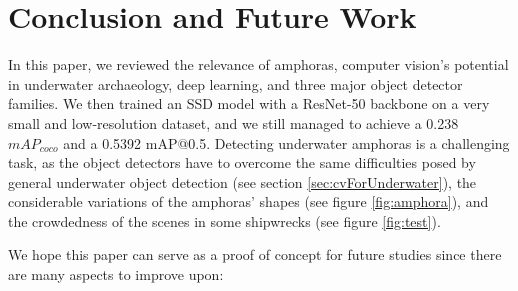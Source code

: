 \documentclass[a4paper, 11pt, oneside]{article}
\begin{document}
\clearpage

\section{Conclusion and Future Work}

In this paper, we reviewed the relevance of amphoras, computer vision's potential in underwater archaeology, deep
learning, and three major object detector families. We then trained an SSD model with a ResNet-50 backbone
on a very small and low-resolution dataset, and we still managed to achieve a 0.238 $mAP_{coco}$ and a 0.5392
mAP@0.5. Detecting underwater amphoras is a challenging task, as the object detectors have to overcome the same
difficulties posed by general underwater object detection (see section \ref{sec:cvForUnderwater}), the considerable
variations of the amphoras' shapes (see figure \ref{fig:amphora}), and the crowdedness of the scenes in some
shipwrecks (see figure \ref{fig:test}).

We hope this paper can serve as a proof of concept for future studies since there are many aspects to improve upon:
\end{document}

